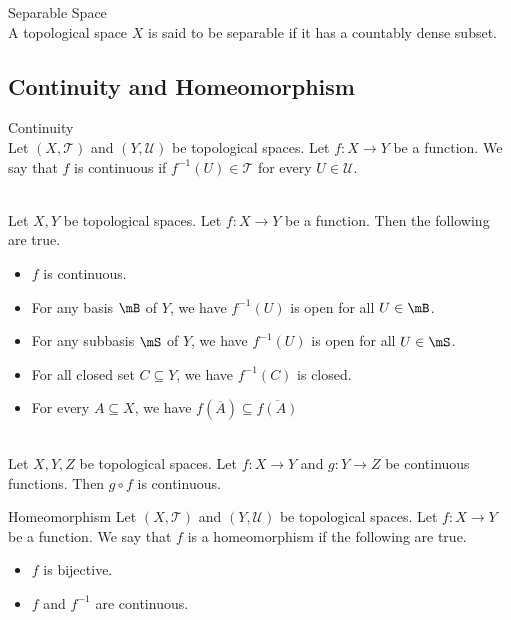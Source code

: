 \documentclass[a4paper]{article}
\begin{document}
\begin{defn}{Separable Space}{}\\
A topological space $X$ is said to be separable if it has a countably dense subset. 
\end{defn}

\subsection{Continuity and Homeomorphism}
\begin{defn}{Continuity}{}\\
Let $(X,\mathcal{T})$ and $(Y,\mathcal{U})$ be topological spaces. Let $f:X\to Y$ be a function. We say that $f$ is continuous if $f^{-1}(U)\in\mathcal{T}$ for every $U\in\mathcal{U}$. 
\end{defn}

\begin{prp}{}{}\\
Let $X,Y$ be topological spaces. Let $f:X\to Y$ be a function. Then the following are true. 
\begin{itemize}
\item $f$ is continuous. 
\item For any basis $\mB$ of $Y$, we have $f^{-1}(U)$ is open for all $U\in\mB$. 
\item For any subbasis $\mS$ of $Y$, we have $f^{-1}(U)$ is open for all $U\in\mS$. 
\item For all closed set $C\subseteq Y$, we have $f^{-1}(C)$ is closed. 
\item For every $A\subseteq X$, we have $f(\overline{A})\subseteq\overline{f(A)}$
\end{itemize}
\end{prp}

\begin{prp}{}{}\\
Let $X,Y,Z$ be topological spaces. Let $f:X\to Y$ and $g:Y\to Z$ be continuous functions. Then $g\circ f$ is continuous. 
\end{prp}

\begin{defn}{Homeomorphism}{} Let $(X,\mathcal{T})$ and $(Y,\mathcal{U})$ be topological spaces. Let $f:X\to Y$ be a function. We say that $f$ is a homeomorphism if the following are true. 
\begin{itemize}
\item $f$ is bijective. 
\item $f$ and $f^{-1}$ are continuous. 
\end{itemize}
\end{defn}
\end{document}
